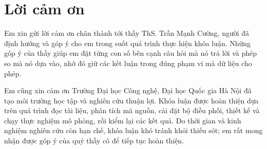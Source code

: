 \chapter*{Lời cảm ơn}

Em xin gửi lời cảm ơn chân thành tới thầy ThS. Trần Mạnh Cường, người đã định hướng và góp ý cho em trong suốt quá
trình thực hiện khóa luận. Những góp ý của thầy giúp em đặt từng con số bên cạnh câu hỏi
mà nó trả lời và phép so mà nó dựa vào, nhờ đó giữ các kết luận trong đúng phạm vi mà dữ liệu cho phép.

Em cũng xin cảm ơn Trường Đại học Công nghệ, Đại học Quốc gia Hà Nội đã tạo môi trường học tập và nghiên cứu thuận
lợi. Khóa luận được hoàn thiện dựa trên quá trình đọc tài liệu, phân tích mã nguồn, cài đặt bộ điều phối, thiết kế
và chạy thực nghiệm mô phỏng, rồi kiểm lại các kết quả. Do thời gian và kinh nghiệm nghiên cứu còn hạn chế, khóa luận
khó tránh khỏi thiếu sót; em rất mong nhận được góp ý của quý thầy cô để tiếp tục hoàn thiện.

\clearpage
